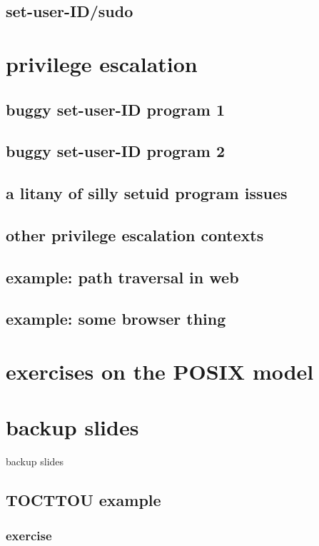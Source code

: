 \subsection{set-user-ID/sudo}


\section{privilege escalation}


\subsection{buggy set-user-ID program 1}


\subsection{buggy set-user-ID program 2}


\subsection{a litany of silly setuid program issues}


\subsection{other privilege escalation contexts}

\subsection{example: path traversal in web}

\subsection{example: some browser thing}


\section{exercises on the POSIX model}


\section{backup slides}
\begin{frame}{backup slides}
\end{frame}

\subsection{TOCTTOU example}




\subsubsection{exercise}


